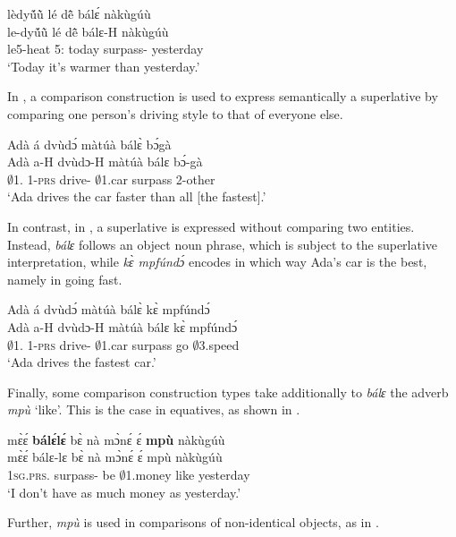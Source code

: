 \ea \label{CC4}
  \glll lèdyṹũ̀ lé dẽ̂ bálɛ́ nàkùgúù \\
        le-dyṹũ̀ lé dẽ̂ bálɛ-H nàkùgúù  \\
       le5-heat 5:{\ATT} today surpass-{\R} yesterday\\
    \trans `Today it's warmer than yesterday.'
\z


In , a comparison construction is used to express semantically a superlative by comparing one person's driving style to that of everyone else.

\ea \label{CC6}
  \glll Adà á dvùdɔ́ màtúà bálɛ̀ bɔ́gà \\
        Adà a-H dvùdɔ-H màtúà bálɛ bɔ́-gà \\
       $\emptyset$1.{\PN} 1-\textsc{prs} drive-{\R} $\emptyset$1.car surpass 2-other\\
    \trans `Ada drives the car faster than all [the fastest].'
\z


\noindent In contrast, in , a superlative is expressed without comparing  two entities. Instead, {\itshape bálɛ} follows an object noun phrase, which is subject to the superlative interpretation, while {\itshape kɛ̀ mpfúndɔ́} encodes in which way Ada's car is the best, namely in going fast.

\ea \label{CC5}
  \glll Adà á dvùdɔ́ màtúà bálɛ̀ kɛ̀ mpfúndɔ́ \\
        Adà a-H dvùdɔ-H màtúà bálɛ kɛ̀ mpfúndɔ́ \\
       $\emptyset$1.{\PN} 1-\textsc{prs} drive-{\R} $\emptyset$1.car surpass go $\emptyset$3.speed\\
    \trans `Ada drives the fastest car.'
\z


Finally, some comparison construction types take additionally to {\itshape bálɛ} the adverb {\itshape mpù} `like'. This is the case in equatives, as shown in .

\ea \label{CC7}
  \glll mɛ̀ɛ́ {\bfseries bálɛ́lɛ́} bɛ̀ nà mɔ̀nɛ́ ɛ́ {\bfseries mpù} nàkùgúù \\
        mɛ̀ɛ́ bálɛ-lɛ bɛ̀ nà mɔ̀nɛ́ ɛ́ mpù nàkùgúù \\
       1\textsc{sg}.\textsc{prs}.{\NEG} surpass-{\NEG} be {\COM} $\emptyset$1.money {\LOC} like yesterday\\
    \trans `I don't have as much money as yesterday.'
\z

\noindent Further, {\itshape mpù} is used in comparisons of non-identical objects, as in .

